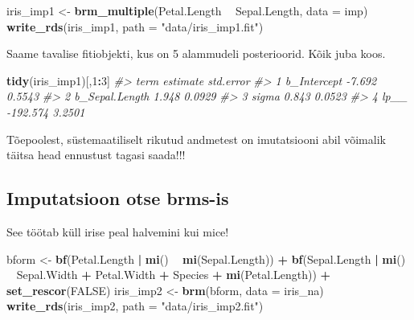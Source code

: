 \documentclass[]{book}
\newenvironment{Shaded}{\begin{snugshade}}{\end{snugshade}}
\newcommand{\CommentTok}[1]{\textcolor[rgb]{0.56,0.35,0.01}{\textit{#1}}}
\newcommand{\DataTypeTok}[1]{\textcolor[rgb]{0.13,0.29,0.53}{#1}}
\newcommand{\DecValTok}[1]{\textcolor[rgb]{0.00,0.00,0.81}{#1}}
\newcommand{\KeywordTok}[1]{\textcolor[rgb]{0.13,0.29,0.53}{\textbf{#1}}}
\newcommand{\NormalTok}[1]{#1}
\newcommand{\OperatorTok}[1]{\textcolor[rgb]{0.81,0.36,0.00}{\textbf{#1}}}
\newcommand{\OtherTok}[1]{\textcolor[rgb]{0.56,0.35,0.01}{#1}}
\newcommand{\StringTok}[1]{\textcolor[rgb]{0.31,0.60,0.02}{#1}}
\begin{document}
\begin{Shaded}
\begin{Highlighting}[]
\NormalTok{iris_imp1 <-}\StringTok{ }\KeywordTok{brm_multiple}\NormalTok{(Petal.Length }\OperatorTok{~}\StringTok{ }\NormalTok{Sepal.Length, }\DataTypeTok{data =}\NormalTok{ imp)}
\KeywordTok{write_rds}\NormalTok{(iris_imp1, }\DataTypeTok{path =} \StringTok{"data/iris_imp1.fit"}\NormalTok{)}
\end{Highlighting}
\end{Shaded}

Saame tavalise fitiobjekti, kus on 5 alammudeli posterioorid. Kõik juba koos.

\begin{Shaded}
\begin{Highlighting}[]
\KeywordTok{tidy}\NormalTok{(iris_imp1)[,}\DecValTok{1}\OperatorTok{:}\DecValTok{3}\NormalTok{]}
\CommentTok{#>             term estimate std.error}
\CommentTok{#> 1    b_Intercept   -7.692    0.5543}
\CommentTok{#> 2 b_Sepal.Length    1.948    0.0929}
\CommentTok{#> 3          sigma    0.843    0.0523}
\CommentTok{#> 4           lp__ -192.574    3.2501}
\end{Highlighting}
\end{Shaded}

Tõepoolest, süstemaatiliselt rikutud andmetest on imutatsiooni abil võimalik täitsa head ennustust tagasi saada!!!

\hypertarget{imputatsioon-otse-brms-is}{%
\subsection*{Imputatsioon otse brms-is}\label{imputatsioon-otse-brms-is}}

See töötab küll irise peal halvemini kui mice!

\begin{Shaded}
\begin{Highlighting}[]
\NormalTok{bform <-}\StringTok{ }\KeywordTok{bf}\NormalTok{(Petal.Length }\OperatorTok{|}\StringTok{ }\KeywordTok{mi}\NormalTok{() }\OperatorTok{~}\StringTok{ }\KeywordTok{mi}\NormalTok{(Sepal.Length)) }\OperatorTok{+}\StringTok{ }
\StringTok{  }\KeywordTok{bf}\NormalTok{(Sepal.Length }\OperatorTok{|}\StringTok{ }\KeywordTok{mi}\NormalTok{() }\OperatorTok{~}\StringTok{ }\NormalTok{Sepal.Width }\OperatorTok{+}\StringTok{ }\NormalTok{Petal.Width }\OperatorTok{+}\StringTok{ }\NormalTok{Species }\OperatorTok{+}\StringTok{ }\KeywordTok{mi}\NormalTok{(Petal.Length)) }\OperatorTok{+}\StringTok{ }\KeywordTok{set_rescor}\NormalTok{(}\OtherTok{FALSE}\NormalTok{)}
\NormalTok{iris_imp2 <-}\StringTok{ }\KeywordTok{brm}\NormalTok{(bform, }\DataTypeTok{data =}\NormalTok{ iris_na)}
\KeywordTok{write_rds}\NormalTok{(iris_imp2, }\DataTypeTok{path =} \StringTok{"data/iris_imp2.fit"}\NormalTok{)}
\end{Highlighting}
\end{Shaded}
\end{document}
